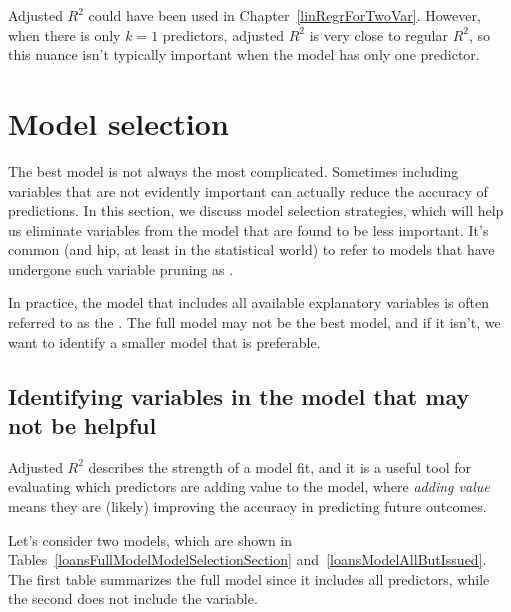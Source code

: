Adjusted $R^2$ could have been used in
Chapter~\ref{linRegrForTwoVar}.
However, when there is only $k = 1$ predictors,
adjusted $R^2$ is very close to regular $R^2$,
so this nuance isn't typically important when
the model has only one predictor.



{}






\section{Model selection}
\label{model_selection_section}
\label{modelSelection}


The best model is not always the most complicated.
Sometimes including variables that are not evidently
important can actually reduce the accuracy of predictions.
In this section, we discuss model selection strategies,
which will help us eliminate variables from the model that
are found to be less important.
It's common (and hip, at least in the statistical world)
to refer to models that have undergone such variable pruning
as .

In practice, the model that includes all available explanatory
variables is often referred to as the .
The full model may not be the best model, and if it isn't,
we want to identify a smaller model that is preferable.


\subsection{Identifying variables in the model that may
    not be helpful}

Adjusted $R^2$ describes the strength of a model fit,
and it is a useful tool for evaluating which predictors
are adding value to the model, where \emph{adding value}
means they are (likely) improving the accuracy in
predicting future outcomes.

Let's consider two models, which are shown in
Tables~\ref{loansFullModelModelSelectionSection}
and~\ref{loansModelAllButIssued}.
The first table summarizes the full model since it includes
all predictors, while the second does not include the
 variable.

